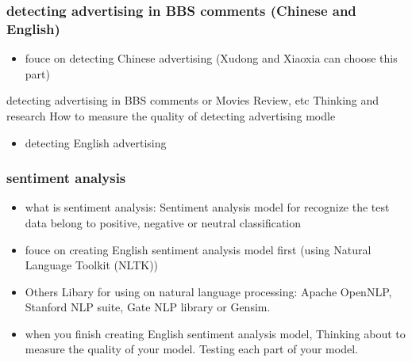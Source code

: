 \documentclass[9pt]{article}
\begin{document}
\subsubsection{detecting advertising in BBS comments (Chinese and English)}
\begin{itemize}
\item fouce on detecting Chinese advertising (Xudong and Xiaoxia can choose this part)
\end{itemize}
detecting advertising in BBS comments or Movies Review, etc
Thinking and research How to measure the quality of detecting advertising modle

\begin{itemize}
\item detecting English advertising
\end{itemize}

\subsubsection{sentiment analysis}
\begin{itemize}
\item what is sentiment analysis: Sentiment analysis model for recognize the test data belong to positive, negative or neutral classification
\item fouce on creating English sentiment analysis model first (using Natural Language Toolkit (NLTK))
\item Others Libary for using on natural language processing: Apache OpenNLP, Stanford NLP suite, Gate NLP library or Gensim.
\item when you finish creating English sentiment analysis model, Thinking about to measure the quality of your model. Testing each part of your model.
\end{itemize}
\end{document}
